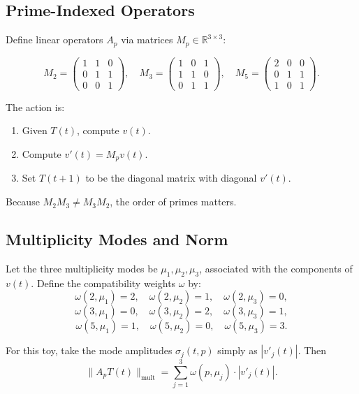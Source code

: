 \documentclass[11pt]{article}
\begin{document}
\subsection{Prime-Indexed Operators}

Define linear operators \(A_p\) via matrices \(M_p \in \mathbb{R}^{3 \times 3}\):

\[
  M_2 = \begin{pmatrix}
  1 & 1 & 0 \\
  0 & 1 & 1 \\
  0 & 0 & 1
  \end{pmatrix},
  \quad
  M_3 = \begin{pmatrix}
  1 & 0 & 1 \\
  1 & 1 & 0 \\
  0 & 1 & 1
  \end{pmatrix},
  \quad
  M_5 = \begin{pmatrix}
  2 & 0 & 0 \\
  0 & 1 & 1 \\
  1 & 0 & 1
  \end{pmatrix}.
\]

The action is:
\begin{enumerate}[leftmargin=1.5em]
  \item Given \(T(t)\), compute \(v(t)\).
  \item Compute \(v'(t) = M_p v(t)\).
  \item Set \(T(t+1)\) to be the diagonal matrix with diagonal \(v'(t)\).
\end{enumerate}

Because \(M_2 M_3 \neq M_3 M_2\), the order of primes matters.

\subsection{Multiplicity Modes and Norm}

Let the three multiplicity modes be \(\mu_1, \mu_2, \mu_3\), associated with the components of \(v(t)\).
Define the compatibility weights \(\omega\) by:
\[
  \omega(2,\mu_1) = 2, \quad \omega(2,\mu_2) = 1, \quad \omega(2,\mu_3) = 0,
\]
\[
  \omega(3,\mu_1) = 0, \quad \omega(3,\mu_2) = 2, \quad \omega(3,\mu_3) = 1,
\]
\[
  \omega(5,\mu_1) = 1, \quad \omega(5,\mu_2) = 0, \quad \omega(5,\mu_3) = 3.
\]

For this toy, take the mode amplitudes \(\sigma_j(t,p)\) simply as \(|v'_j(t)|\).
Then
\begin{equation}
  \|A_p T(t)\|_{\text{mult}}
  = \sum_{j=1}^{3} \omega(p,\mu_j)\cdot |v'_j(t)|.
\end{equation}
\end{document}
